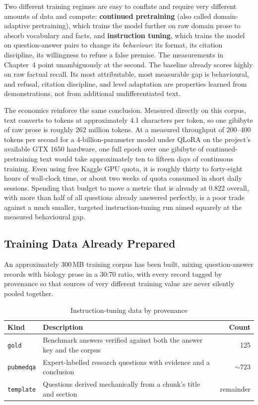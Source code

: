 Two different training regimes are easy to conflate and require very
different amounts of data and compute: \textbf{continued pretraining}
(also called domain-adaptive pretraining), which trains the model
further on raw domain prose to absorb vocabulary and facts, and
\textbf{instruction tuning}, which trains the model on question-answer
pairs to change its \emph{behaviour}: its format, its citation
discipline, its willingness to refuse a false premise. The measurements in
Chapter~4 point unambiguously at the second. The baseline already scores
highly on raw factual recall. Its most attributable, most measurable gap
is behavioural, and refusal, citation discipline, and level adaptation are
properties learned from demonstrations, not from additional undifferentiated
text.

The economics reinforce the same conclusion. Measured directly on this
corpus, text converts to tokens at approximately 4.1 characters per token,
so one gibibyte of raw prose is roughly 262 million tokens. At a
measured throughput of 200--400 tokens per second for a 4-billion-parameter
model under QLoRA \cite{dettmers2023qlora} on the project's available GTX
1650 hardware, one full epoch over one gibibyte of continued-pretraining
text would take approximately ten to fifteen days of continuous training.
Even using free Kaggle GPU quota, it is roughly thirty to forty-eight hours
of wall-clock time, or about two weeks of quota consumed in short daily
sessions. Spending that budget to move a metric that is already at 0.822
overall, with more than half of all questions already answered perfectly,
is a poor trade against a much smaller, targeted instruction-tuning run
aimed squarely at the measured behavioural gap.

\subsection{Training Data Already Prepared}\label{5.3.2}

An approximately 300\,MB training corpus has been built, mixing
question-answer records with biology prose in a 30:70 ratio, with every
record tagged by provenance so that sources of very different training
value are never silently pooled together.

\begin{table}[h]
\centering
\caption{Instruction-tuning data by provenance}
\label{tab:5.1}
\small
\begin{tabularx}{\textwidth}{@{}lXr@{}}
\toprule
\textbf{Kind} & \textbf{Description} & \textbf{Count} \\
\midrule
\texttt{gold} & Benchmark answers verified against both the answer key and the corpus & 125 \\
\texttt{pubmedqa} & Expert-labelled research questions with evidence and a conclusion & $\sim$723 \\
\texttt{template} & Questions derived mechanically from a chunk's title and section & remainder \\
\bottomrule
\end{tabularx}
\end{table}

